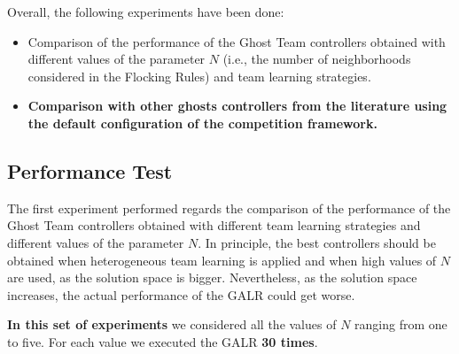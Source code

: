 \documentclass[journal]{IEEEtran}
\begin{document}
Overall, the following experiments have been done:

\begin{itemize}
  \item Comparison of the performance of the Ghost Team controllers obtained with different values of the parameter $N$ (i.e., the number of neighborhoods considered in the Flocking Rules) and team learning strategies.
  \item \textbf{Comparison with other ghosts controllers from the literature using the default configuration of the competition framework.}
\end{itemize}

\subsection{Performance Test}
The first experiment performed regards the comparison of the performance of the Ghost Team controllers obtained with different team learning strategies and different values of the parameter $N$. In principle, the best controllers should be obtained when heterogeneous team learning is applied and when high values of $N$ are used, as the solution space is bigger. Nevertheless, as the solution space increases, the actual performance of the GALR could get worse.

\textbf{In this set of experiments }we considered all the values of $N$ ranging from one to five. For each value we executed the GALR \textbf{30 times}.
\end{document}
